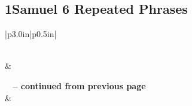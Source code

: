 \subsection{1Samuel 6 Repeated Phrases}


\normalsize
 
\begin{center}
\begin{longtable}{|p{3.0in}|p{0.5in}|}
\caption[1Samuel 6 Repeated Phrases]{1Samuel 6 Repeated Phrases}\label{table:Repeated Phrases 1Samuel 6} \\
\hline {} &  \\ \hline 
\endfirsthead
 
{{\bfseries \tablename\ \thetable{} -- continued from previous page}} \\  
\hline {} &  \\ \hline 
\endhead
 

\end{longtable}
\end{center}
